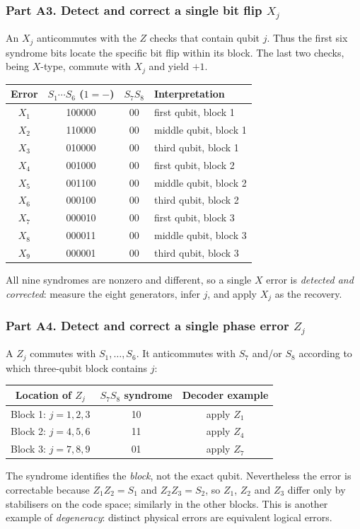 \subsubsection*{Part A3. Detect and correct a single bit flip $X_j$}
An $X_j$ anticommutes with the $Z$ checks that contain qubit $j$. Thus the first six syndrome bits locate the specific bit flip within its block. The last two checks, being $X$-type, commute with $X_j$ and yield $+1$.
\begin{center}\small
\begin{tabular}{@{}cccl@{}}\toprule
Error&$S_1\cdots S_6$ ($1=-$)&$S_7S_8$&Interpretation\\\midrule
$X_1$&100000&00&first qubit, block 1\\
$X_2$&110000&00&middle qubit, block 1\\
$X_3$&010000&00&third qubit, block 1\\
$X_4$&001000&00&first qubit, block 2\\
$X_5$&001100&00&middle qubit, block 2\\
$X_6$&000100&00&third qubit, block 2\\
$X_7$&000010&00&first qubit, block 3\\
$X_8$&000011&00&middle qubit, block 3\\
$X_9$&000001&00&third qubit, block 3\\\bottomrule
\end{tabular}\end{center}
All nine syndromes are nonzero and different, so a single $X$ error is \emph{detected and corrected}: measure the eight generators, infer $j$, and apply $X_j$ as the recovery.

\subsubsection*{Part A4. Detect and correct a single phase error $Z_j$}
A $Z_j$ commutes with $S_1,\ldots,S_6$. It anticommutes with $S_7$ and/or $S_8$ according to which three-qubit block contains $j$:
\begin{center}\small
\begin{tabular}{@{}ccc@{}}\toprule
Location of $Z_j$&$S_7S_8$ syndrome&Decoder example\\\midrule
Block 1: $j=1,2,3$&10&apply $Z_1$\\
Block 2: $j=4,5,6$&11&apply $Z_4$\\
Block 3: $j=7,8,9$&01&apply $Z_7$\\\bottomrule
\end{tabular}\end{center}
The syndrome identifies the \emph{block}, not the exact qubit. Nevertheless the error is correctable because $Z_1Z_2=S_1$ and $Z_2Z_3=S_2$, so $Z_1$, $Z_2$ and $Z_3$ differ only by stabilisers on the code space; similarly in the other blocks. This is another example of \emph{degeneracy}: distinct physical errors are equivalent logical errors.

